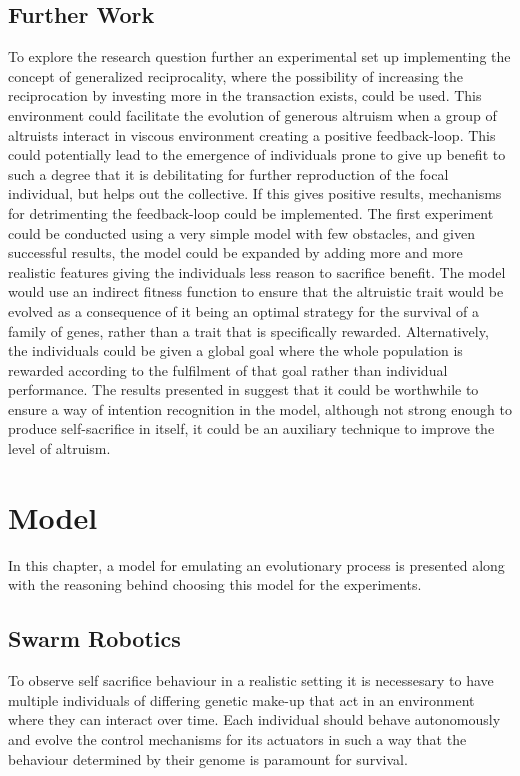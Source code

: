 \documentclass[a4paper]{book}
\begin{document}
\section{Further Work}
To explore the research question further an experimental set up implementing the concept of generalized reciprocality, where the possibility of increasing the reciprocation by investing more in the transaction exists, could be used. 
This environment could facilitate the evolution of generous altruism when a group of altruists interact in viscous environment creating a positive feedback-loop. 
This could potentially lead to the emergence of individuals prone to give up benefit to such a degree that it is debilitating for further reproduction of the focal individual, but helps out the collective. 
If this gives positive results, mechanisms for detrimenting the feedback-loop could be implemented. 
The first experiment could be conducted using a very simple model with few obstacles, and given successful results, the model could be expanded by adding more and more realistic features giving the individuals less reason to sacrifice benefit. The model would use an indirect fitness function to ensure that the altruistic trait would be evolved as a consequence of it being an optimal strategy for the survival of a family of genes, rather than a trait that is specifically rewarded. Alternatively, the individuals could be given a global goal where the whole population is rewarded according to the fulfilment of that goal rather than individual performance. 
The results presented in \cite{han_role_2011} suggest that it could be worthwhile to ensure a way of intention recognition in the model, although not strong enough to produce self-sacrifice in itself, it could be an auxiliary technique to improve the level of altruism.

\chapter{Model}
\label{cha:model}

In this chapter, a model for emulating an evolutionary process is presented along with the reasoning behind choosing this model for the experiments.

\section{Swarm Robotics}
\label{sec:swarm}
To observe self sacrifice behaviour in a realistic setting it is necessesary to have multiple individuals of differing genetic make-up that act in an environment where they can interact over time. 
Each individual should behave autonomously and evolve the control mechanisms for its actuators in such a way that the behaviour determined by their genome is paramount for survival.
\end{document}
